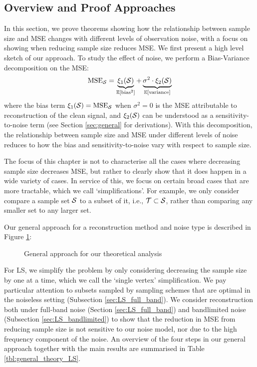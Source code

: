 \subsection{Overview and Proof Approaches}
\label{sec:theory-overview}
In this section, we prove theorems showing how the relationship between sample size and MSE changes with different levels of observation noise, with a focus on showing when reducing sample size reduces MSE. We first present a high level sketch of our approach. To study the effect of noise, we perform a Bias-Variance decomposition on the MSE:
\begin{equation}
    \textrm{MSE}_{\set{S}} = \underbrace{\xi_{1}(\set{S})}_{\expect{\text{bias}^{2}}} + \underbrace{\sigma^{2} \cdot \xi_{2}(\set{S})}_{\expect{\text{variance}}} 
\end{equation}
where the bias term $\xi_{1}(\mathcal{S}) = \text{MSE}_{\mathcal{S}}$ when $\sigma^{2} = 0$ is the MSE attributable to reconstruction of the clean signal, and $\xi_{2}(\mathcal{S})$ can be understood as a sensitivity-to-noise term (see Section \ref{sec:general} for derivations).
With this decomposition, the relationship between sample size and MSE under different levels of noise reduces to how the bias and sensitivity-to-noise vary with respect to sample size. 

The focus of this chapter is not to characterise all the cases where decreasing sample size decreases MSE, but rather to clearly show that it does happen in a wide variety of cases. In service of this, we focus on certain broad cases that are more tractable, which we call `simplifications'. For example, we only consider compare a sample set $\mathcal{S}$ to a subset of it, i.e., $\mathcal{T} \subset \mathcal{S}$, rather than comparing any smaller set to any larger set.

Our general approach for a reconstruction method and noise type is described in Figure \ref{fig:theory_structure_flowchart}:
\begin{figure}[htbp]
    \centering
    
    \caption{General approach for our theoretical analysis}
    \label{fig:theory_structure_flowchart}
\end{figure}
For LS, we simplify the problem by only considering decreasing the sample size by one at a time, which we call the `single vertex' simplification. We pay particular attention to subsets sampled by sampling schemes that are optimal in the noiseless setting (Subsection \ref{sec:LS_full_band}). 
We consider reconstruction both under full-band noise (Section \ref{sec:LS_full_band}) and bandlimited noise (Subsection \ref{sec:LS_bandlimited}) to show that the reduction in MSE from reducing sample size is not sensitive to our noise model, nor due to the high frequency component of the noise.
An overview of the four steps in our general approach together with the main results are summarised in Table \ref{tbl:general_theory_LS}.


